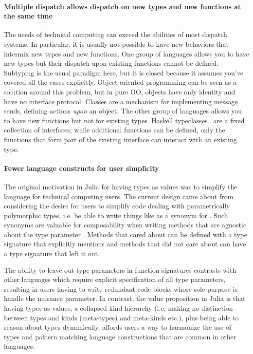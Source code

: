 \paragraph{Multiple dispatch allows dispatch on new types and new functions at the same time}


The needs of technical computing can exceed the abilities of most dispatch systems. In particular, it is usually not possible to have new behaviors that intermix new types and new functions. One group of languages allows you to have new types but their dispatch upon existing functions cannot be defined. Subtyping is the usual paradigm here, but it is closed because it assumes you've covered all the cases explicitly. Object oriented programming can be seen as a solution around this problem, but in pure OO, objects have only identity and have no interface protocol. Classes are a mechanism for implementing message sends, defining actions \textit{upon} an object. The other group of languages allows you to have new functions but not for existing types. Haskell typeclasses~\cite{typeclass} are a fixed collection of interfaces; while additional functions can be defined, only the functions that form part of the existing interface can interact with an existing type.

\paragraph{Fewer language constructs for user simplicity}

The original motivation in Julia for having types as values was to simplify the
language for technical computing users. The current design came about from
considering the desire for users to simplify code dealing with parametrically
polymorphic types, i.e. be able to write things like  as a synonym
for . Such synonyms are valuable for composability when writing 
methods that are agnostic about the type parameter . Methods that cared
about  can be defined with a type signature that explicitly mentions
 and methods that did not care about  can have a type signature
that left it out.

The ability to leave out type parameters in function signatures contrasts with
other languages which require explicit specification of all type parameters,
resulting in users having to write redundant code blocks whose sole purpose is
handle the nuisance parameter. In contrast, the value proposition in Julia is
that having types as values, a collapsed kind hierarchy (i.e. making no
distinction between types and kinds (meta-types) and meta-kinds etc.), plus
being able to reason about types dynamically, affords users a way to harmonize
the use of types and pattern matching language constructions that are common in
other languages.
